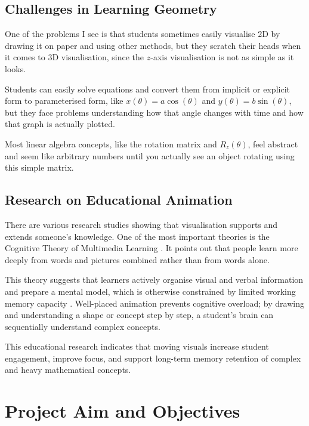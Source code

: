 \documentclass[12pt, a4paper]{report}
\begin{document}
\section{Challenges in Learning Geometry}

One of the problems I see is that students sometimes easily visualise 2D by drawing it on paper and using other methods, but they scratch their heads when it comes to 3D visualisation, since the \(z\)-axis visualisation is not as simple as it looks.

Students can easily solve equations and convert them from implicit or explicit form to parameterised form, like \(x(\theta) = a \cos(\theta)\) and \(y(\theta) = b \sin(\theta)\), but they face problems understanding how that angle changes with time and how that graph is actually plotted.

Most linear algebra concepts, like the rotation matrix and \(R_z(\theta)\), feel abstract and seem like arbitrary numbers until you actually see an object rotating using this simple matrix.


\section{Research on Educational Animation}

There are various research studies showing that visualisation supports and extends someone's knowledge. One of the most important theories is the Cognitive Theory of Multimedia Learning \cite{waxman2023}. It points out that people learn more deeply from words and pictures combined rather than from words alone.

This theory suggests that learners actively organise visual and verbal information and prepare a mental model, which is otherwise constrained by limited working memory capacity \cite{waxman2023}. Well-placed animation prevents cognitive overload; by drawing and understanding a shape or concept step by step, a student's brain can sequentially understand complex concepts.

This educational research indicates that moving visuals increase student engagement, improve focus, and support long-term memory retention of complex and heavy mathematical concepts.


\chapter{Project Aim and Objectives}
\end{document}
